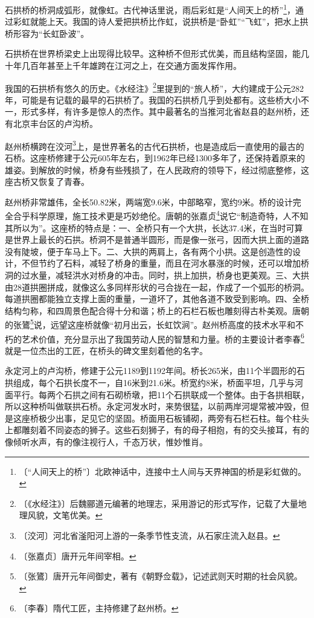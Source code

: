 \documentclass[12pt,UTF-8,openany]{ctexbook}
\begin{document}
\begin{normalsize}
    
    石拱桥的桥洞成弧形，就像虹。古代神话里说，雨后彩虹是“人间天上的桥”\footnote{〔“人间天上的桥”〕北欧神话中，连接中土人间与天界神国的桥是彩虹做的。}，通过彩虹就能上天。我国的诗人爱把拱桥比作虹，说拱桥是“卧虹”“飞虹”，把水上拱桥形容为“长虹卧波”。
    
    石拱桥在世界桥梁史上出现得比较早。这种桥不但形式优美，而且结构坚固，能几十年几百年甚至上千年雄跨在江河之上，在交通方面发挥作用。
    
    我国的石拱桥有悠久的历史。《水经注》\footnote{〔《水经注》〕后魏郦道元编著的地理志，采用游记的形式写作，记载了大量地理风貌，文笔优美。}里提到的“旅人桥”，大约建成于公元282年，可能是有记载的最早的石拱桥了。我国的石拱桥几乎到处都有。这些桥大小不一，形式多样，有许多是惊人的杰作。其中最著名的当推河北省赵县的赵州桥，还有北京丰台区的卢沟桥。
    
    赵州桥横跨在洨河\footnote{〔洨河〕河北省滏阳河上游的一条季节性支流，从石家庄流入赵县。}上，是世界著名的古代石拱桥，也是造成后一直使用的最古的石桥。这座桥修建于公元605年左右，到1962年已经1300多年了，还保持着原来的雄姿。到解放的时候，桥身有些残损了，在人民政府的领导下，经过彻底整修，这座古桥又恢复了青春。
    
    赵州桥非常雄伟，全长50.82米，两端宽9.6米，中部略窄，宽约9米。桥的设计完全合乎科学原理，施工技术更是巧妙绝伦。唐朝的张嘉贞\footnote{〔张嘉贞〕唐开元年间宰相。}说它“制造奇特，人不知其所以为”。这座桥的特点是：一、全桥只有一个大拱，长达37.4米，在当时可算是世界上最长的石拱。桥洞不是普通半圆形，而是像一张弓，因而大拱上面的道路没有陡坡，便于车马上下。二、大拱的两肩上，各有两个小拱。这是创造性的设计，不但节约了石料，减轻了桥身的重量，而且在河水暴涨的时候，还可以增加桥洞的过水量，减轻洪水对桥身的冲击。同时，拱上加拱，桥身也更美观。三、大拱由28道拱圈拼成，就像这么多同样形状的弓合拢在一起，作成了一个弧形的桥洞。每道拱圈都能独立支撑上面的重量，一道坏了，其他各道不致受到影响。四、全桥结构匀称，和四周景色配合得十分和谐；桥上的石栏石板也雕刻得古朴美观。唐朝的张鷟\footnote{〔张鷟〕唐开元年间御史，著有《朝野佥载》，记述武则天时期的社会风貌。}说，远望这座桥就像“初月出云，长虹饮涧”。赵州桥高度的技术水平和不朽的艺术价值，充分显示出了我国劳动人民的智慧和力量。桥的主要设计者李春\footnote{〔李春〕隋代工匠，主持修建了赵州桥。}就是一位杰出的工匠，在桥头的碑文里刻着他的名字。
    
    永定河上的卢沟桥，修建于公元1189到1192年间。桥长265米，由11个半圆形的石拱组成，每个石拱长度不一，自16米到21.6米。桥宽约8米，桥面平坦，几乎与河面平行。每两个石拱之间有石砌桥墩，把11个石拱联成一个整体。由于各拱相联，所以这种桥叫做联拱石桥。永定河发水时，来势很猛，以前两岸河堤常被冲毁，但是这座桥极少出事，足见它的坚固。桥面用石板铺砌，两旁有石栏石柱。每个柱头上都雕刻着不同姿态的狮子。这些石刻狮子，有的母子相抱，有的交头接耳，有的像倾听水声，有的像注视行人，千态万状，惟妙惟肖。
    

\end{normalsize}
\end{document}
